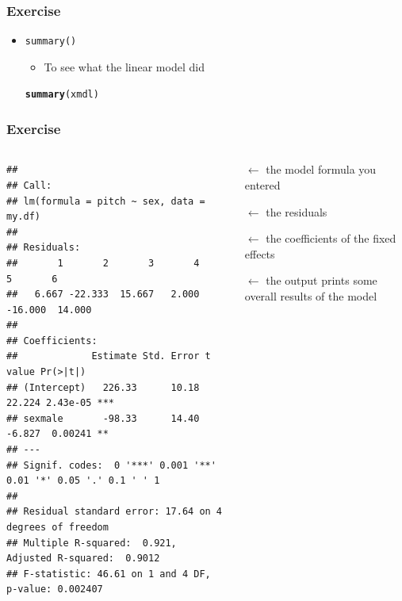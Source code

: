 \documentclass{beamer}\usepackage[]{graphicx}\usepackage[]{color}
\makeatletter
\newcommand{\hlstd}[1]{\textcolor[rgb]{0.345,0.345,0.345}{#1}}%
\newcommand{\hlkwd}[1]{\textcolor[rgb]{0.737,0.353,0.396}{\textbf{#1}}}%
\newenvironment{kframe}{%
 \def\at@end@of@kframe{}%
 \ifinner\ifhmode%
  \def\at@end@of@kframe{\end{minipage}}%
  \begin{minipage}{\columnwidth}%
 \fi\fi%
 \def\FrameCommand##1{\hskip\@totalleftmargin \hskip-\fboxsep
 \colorbox{shadecolor}{##1}\hskip-\fboxsep
     \hskip-\linewidth \hskip-\@totalleftmargin \hskip\columnwidth}%
 \MakeFramed {\advance\hsize-\width
   \@totalleftmargin\z@ \linewidth\hsize
   \@setminipage}}%
 {\par\unskip\endMakeFramed%
 \at@end@of@kframe}
\newenvironment{knitrout}{}{} %
\makeatother
\begin{document}
\begin{frame}[fragile]
\frametitle{Exercise}
\begin{itemize}

\item \texttt{summary()}
	\begin{itemize}
	\item To see what the linear model did
	\end{itemize}
\begin{knitrout}
\color{fgcolor}\begin{kframe}
\begin{alltt}
\hlkwd{summary}\hlstd{(xmdl)}
\end{alltt}
\end{kframe}
\end{knitrout}
\end{itemize}
\end{frame}


\begin{frame}[fragile]
\frametitle{Exercise}

\begin{columns}[T]
\begin{column}{.7\textwidth}
\begin{knitrout}\tiny
{}\color{fgcolor}\begin{kframe}
\begin{verbatim}
## 
## Call:
## lm(formula = pitch ~ sex, data = my.df)
## 
## Residuals:
##       1       2       3       4       5       6 
##   6.667 -22.333  15.667   2.000 -16.000  14.000 
## 
## Coefficients:
##             Estimate Std. Error t value Pr(>|t|)    
## (Intercept)   226.33      10.18  22.224 2.43e-05 ***
## sexmale       -98.33      14.40  -6.827  0.00241 ** 
## ---
## Signif. codes:  0 '***' 0.001 '**' 0.01 '*' 0.05 '.' 0.1 ' ' 1
## 
## Residual standard error: 17.64 on 4 degrees of freedom
## Multiple R-squared:  0.921,	Adjusted R-squared:  0.9012 
## F-statistic: 46.61 on 1 and 4 DF,  p-value: 0.002407
\end{verbatim}
\end{kframe}
\end{knitrout}
\end{column}
\begin{column}{.35\textwidth}
\vspace{15pt}
$\leftarrow$ the model formula you entered 

$\leftarrow$ the residuals

\vspace{14pt}
$\leftarrow$ the coefficients of the fixed effects

\vspace{18pt}
$\leftarrow$ the output prints some overall results of the model
\end{column}
\end{columns}
\end{frame}
\end{document}
